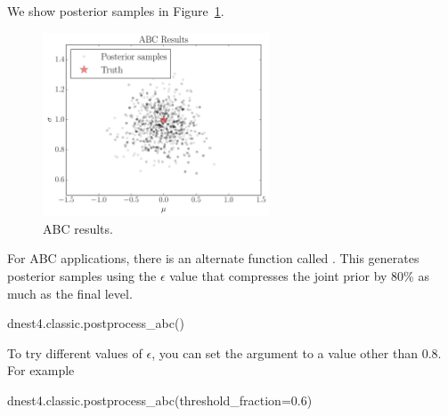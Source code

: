 \documentclass[article]{jss}
\newcommand{\params}{\theta}
\begin{document}
We show posterior samples in Figure~\ref{fig:abc_results}.

\begin{figure}[ht!]
\centering
\includegraphics[width=0.6\textwidth]{figures/abc_results.pdf}
\caption{ABC results.\label{fig:abc_results}}
\end{figure}



For ABC applications, there is an alternate  function
called .
This generates posterior samples using the $\epsilon$ value that
compresses the joint prior by 80\% as much as the final level.
\begin{CodeChunk}
\begin{CodeInput}
dnest4.classic.postprocess_abc()
\end{CodeInput}
\end{CodeChunk}
To try different values of $\epsilon$, you can set the argument
 to a value other than 0.8. For example
\begin{CodeChunk}
\begin{CodeInput}
dnest4.classic.postprocess_abc(threshold_fraction=0.6)
\end{CodeInput}
\end{CodeChunk}


\end{document}

